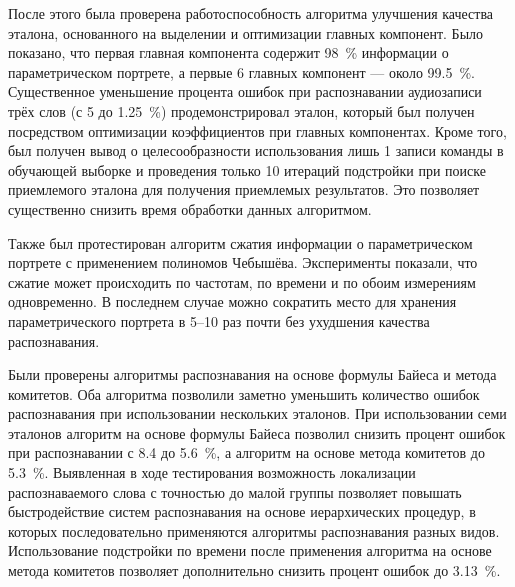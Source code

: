 После этого была проверена работоспособность алгоритма улучшения качества эталона, основанного на выделении и оптимизации главных компонент.
Было показано, что первая главная компонента содержит 98~\% информации о параметрическом портрете, а первые 6 главных компонент --- около 99.5~\%.
Существенное уменьшение процента ошибок при распознавании аудиозаписи трёх слов (с 5 до 1.25~\%) продемонстрировал эталон, который был получен посредством оптимизации коэффициентов при главных компонентах.
Кроме того, был получен вывод о целесообразности использования лишь 1 записи команды в обучающей выборке и проведения только 10 итераций подстройки при поиске приемлемого эталона для получения приемлемых результатов.
Это позволяет существенно снизить время обработки данных алгоритмом.

Также был протестирован алгоритм сжатия информации о параметрическом портрете с применением полиномов Чебышёва.
Эксперименты показали, что сжатие может происходить по частотам, по времени и по обоим измерениям одновременно.
В последнем случае можно сократить место для хранения параметрического портрета в 5--10 раз почти без ухудшения качества распознавания.	

Были проверены алгоритмы распознавания на основе формулы Байеса и метода комитетов.
Оба алгоритма позволили заметно уменьшить количество ошибок распознавания при использовании нескольких эталонов.
При использовании семи эталонов алгоритм на основе формулы Байеса позволил снизить процент ошибок при распознавании с 8.4 до 5.6~\%, а алгоритм на основе метода комитетов до 5.3~\%.
Выявленная в ходе тестирования возможность локализации распознаваемого слова с точностью до малой группы позволяет повышать быстродействие систем распознавания на основе иерархических процедур, в которых последовательно применяются алгоритмы распознавания разных видов.
Использование подстройки по времени после применения алгоритма на основе метода комитетов позволяет дополнительно снизить процент ошибок до 3.13~\%.


\clearpage